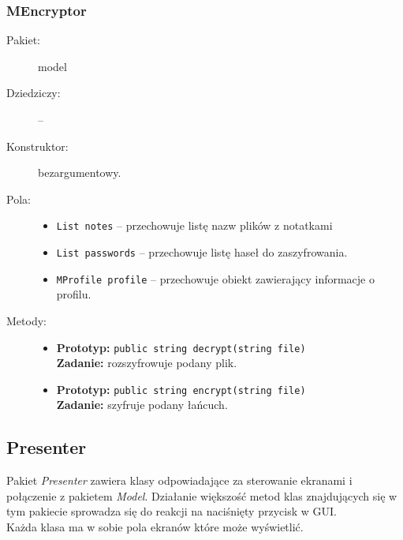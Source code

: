 \documentclass[a4paper]{article}
\newcommand{\prog}{\texttt}
\begin{document}
\subsubsection{MEncryptor}
\begin{description}
    \item[Pakiet:] model
    \item[Dziedziczy:] --
    \item[Konstruktor:] bezargumentowy.
    \item[Pola:] \hfill
    \begin{itemize}
        \item \prog{List notes} -- przechowuje listę nazw plików z notatkami
        \item \prog{List passwords} -- przechowuje listę haseł do zaszyfrowania.
        \item \prog{MProfile profile} -- przechowuje obiekt zawierający informacje o profilu.
    \end{itemize}
    \item[Metody:] \hfill
    \begin{itemize}
        \item \textbf{Prototyp:} \prog{public string decrypt(string file)}\\\textbf{Zadanie:} rozszyfrowuje podany plik.
        \item \textbf{Prototyp:} \prog{public string encrypt(string file)}\\\textbf{Zadanie:} szyfruje podany łańcuch.
    \end{itemize}
\end{description}

\subsection{Presenter}
Pakiet \textit{Presenter} zawiera klasy odpowiadające za sterowanie ekranami i połączenie z pakietem \textit{Model}. Działanie większość metod klas znajdujących się w tym pakiecie sprowadza się do reakcji na naciśnięty przycisk w GUI.\\
Każda klasa ma w sobie pola ekranów które może wyświetlić.
\end{document}
